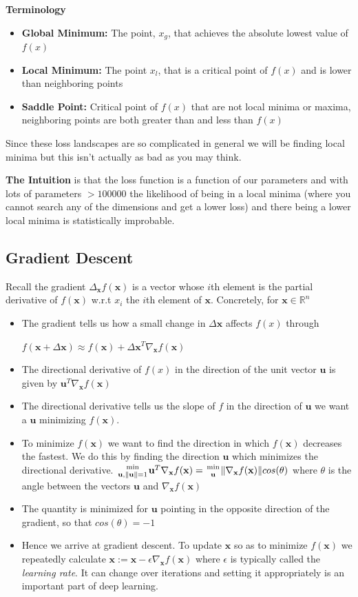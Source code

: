 \documentclass[twocolumn, letter, 10pt, landscape]{article}
\newcommand{\mb}{\mathbf}
\newcommand{\tb}{\textbf}
\newcommand{\ti}{\textit}
\newcommand{\bit}{\vspace{-0.1in}\begin{itemize}\setlength\itemsep{-0.05in}}
\newcommand{\eit}{\end{itemize}\vspace{-0.1in}}
\begin{document}
\tb{Terminology}
\bit{}
\item \tb{Global Minimum:} The point, $x_g$, that achieves the absolute lowest value of $f(x)$
\item \tb{Local Minimum:} The point $x_l$, that is a critical point of $f(x)$ and is lower than neighboring points
\item \tb{Saddle Point:} Critical point of $f(x)$ that are not local minima or maxima, neighboring points are both greater than and less than $f(x)$
\eit{}

Since these loss landscapes are so complicated in general we will be finding local minima but this isn't actually as bad as you may think.

\tb{The Intuition} is that the loss function is a function of our parameters and with lots of parameters $>100000$ the likelihood of being in a local minima (where you cannot search any of the dimensions and get a lower loss) and there being a lower local minima is statistically improbable.

\subsection{Gradient Descent}
Recall the gradient $\Delta_{\mb{x}}f(\mb{x})$ is a vector whose $i$th element is the partial derivative of $f(\mb{x})$ w.r.t $x_i$ the $i$th element of $\mb{x}$. Concretely, for $\mb{x}\in\mathbb{R}^n$

\bit{}
\item The gradient tells us how a small change in $\Delta \mb{x}$ affects $f(x)$ through

$f(\mb{x}+\Delta\mb{x})\approx f(\mb{x})+\Delta\mb{x}^T\nabla_\mb{x}f(\mb{x})$
\item The directional derivative of $f(x)$ in the direction of the unit vector $\mb{u}$ is given by $\mb{u}^T\nabla_\mb{x}f(\mb{x})$
\item The directional derivative tells us the slope of $f$ in the direction of $\mb{u}$ we want a $\mb{u}$ minimizing $f(\mb{x})$.
\item To minimize $f(\mb{x})$ we want to find the direction in which $f(\mb{x})$ decreases the fastest. We do this by finding the direction $\mb{u}$ which minimizes the directional derivative. ${\text{min}\atop\mb{u}, \|\mb{u}\|=1}\mb{u}^T\nabla_\mb{x}f(\mb{x}) = {\text{min}\atop\mb{u}} \|\nabla_\mb{x}f(\mb{x})\|cos(\theta)$ where $\theta$ is the angle between the vectors $\mb{u}$ and $\nabla_\mb{x}f(\mb{x})$
\item The quantity is minimized for $\mb{u}$ pointing in the opposite direction of the gradient, so that $cos(\theta) = -1$
\item Hence we arrive at gradient descent. To update $\mb{x}$ so as to minimize $f(\mb{x})$ we repeatedly calculate $\mb{x} := \mb{x}-\epsilon\nabla_\mb{x}f(\mb{x})$ where $\epsilon$ is typically called the \ti{learning rate}. It can change over iterations and setting it appropriately is an important part of deep learning.
\eit{}
\end{document}
